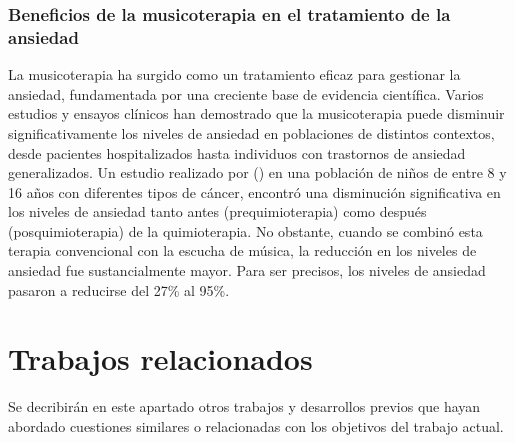\subsubsection{Beneficios de la musicoterapia en el tratamiento de la ansiedad}

La musicoterapia ha surgido como un tratamiento eficaz para gestionar la ansiedad, fundamentada por una creciente base de evidencia científica. Varios estudios y ensayos clínicos han demostrado que la musicoterapia puede disminuir significativamente los niveles de ansiedad en poblaciones de distintos contextos, desde pacientes hospitalizados hasta individuos con trastornos de ansiedad generalizados. Un estudio realizado por \citeauthor{SEPULVEDA:2014} (\citeyear{SEPULVEDA:2014}) en una población de niños de entre 8 y 16 años con diferentes tipos de cáncer, encontró una disminución significativa en los niveles de ansiedad tanto antes (prequimioterapia) como después (posquimioterapia) de la quimioterapia. No obstante, cuando se combinó esta terapia convencional con la escucha de música, la reducción en los niveles de ansiedad fue sustancialmente mayor. Para ser precisos, los niveles de ansiedad pasaron a reducirse del 27\% al 95\%.

\section{Trabajos relacionados}

Se decribirán en este apartado otros trabajos y desarrollos previos que hayan abordado cuestiones similares o relacionadas con los objetivos del trabajo actual.

